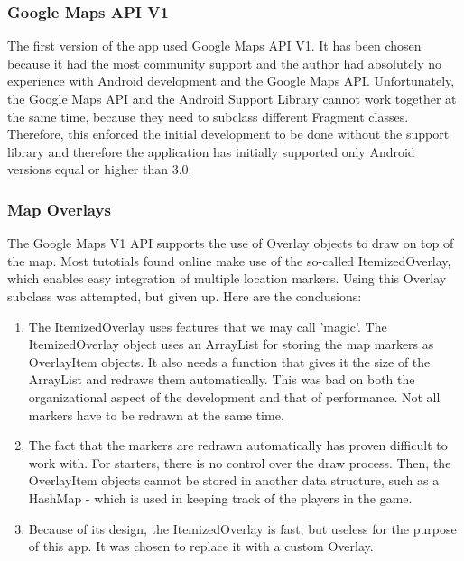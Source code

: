 \documentclass{article}
\begin{document}
\subsubsection{Google Maps API V1}

The first version of the app used Google Maps API V1. It has been chosen
because it had the most community support and the author had absolutely no
experience with Android development and the Google Maps API.  Unfortunately, the
Google Maps API and the Android Support Library cannot work together at the same
time, because they need to subclass different Fragment classes. Therefore, this
enforced the initial development to be done without the support library and
therefore the application has initially supported only Android versions equal or
higher than 3.0.

\subsubsection{Map Overlays}

The Google Maps V1 API supports the use of Overlay objects to draw on top
of the map. Most tutotials found online make use of the so-called
ItemizedOverlay, which enables easy integration of multiple location markers.
Using this Overlay subclass was attempted, but given up. Here are the
conclusions: \newline
\begin{enumerate}
  \item The ItemizedOverlay uses features that we may call 'magic'. The
  ItemizedOverlay object uses an ArrayList for storing the map markers as
  OverlayItem objects. It also needs a function that gives it the size of the
  ArrayList and redraws them automatically. This was bad on both the
  organizational aspect of the development and that of performance. Not all
  markers have to be redrawn at the same time.
  
  \item The fact that the markers are redrawn automatically has proven difficult
  to work with. For starters, there is no control over the draw process. Then,
  the OverlayItem objects cannot be stored in another data structure, such as a
  HashMap - which is used in keeping track of the players in the game.
  
  \item Because of its design, the ItemizedOverlay is fast, but useless for the
  purpose of this app. It was chosen to replace it with a custom Overlay.   
\end{enumerate}
\end{document}
